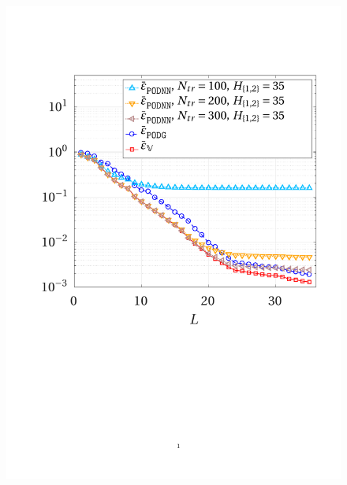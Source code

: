 \documentclass[12pt, a4paper, twoside, openright, notitlepage]{report}
\numberwithin{equation}{chapter}
\theoremstyle{theorem}
\theoremstyle{definition}
\theoremstyle{remark}
\theoremstyle{proposition}
\numberwithin{figure}{chapter}
\begin{document}
\begin{figure}[H]
			\center
			\includegraphics[scale = 0.4, trim = {1.5cm 9cm 1.5cm 3.5cm}, clip]{poisson2d_2_error_vs_rank}
			\hfill

\end{figure}
\end{document}
